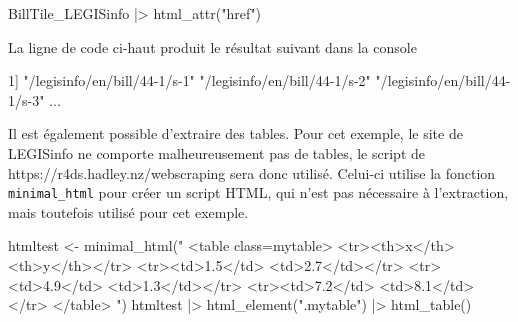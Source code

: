 \documentclass[
  letterpaper,
  DIV=11,
  numbers=noendperiod,
  oneside]{scrreprt}
\newenvironment{Shaded}{\begin{snugshade}}{\end{snugshade}}
\newcommand{\ErrorTok}[1]{\textcolor[rgb]{0.68,0.00,0.00}{#1}}
\newcommand{\ExtensionTok}[1]{\textcolor[rgb]{0.00,0.23,0.31}{#1}}
\newcommand{\KeywordTok}[1]{\textcolor[rgb]{0.00,0.23,0.31}{#1}}
\newcommand{\NormalTok}[1]{\textcolor[rgb]{0.00,0.23,0.31}{#1}}
\newcommand{\OperatorTok}[1]{\textcolor[rgb]{0.37,0.37,0.37}{#1}}
\newcommand{\StringTok}[1]{\textcolor[rgb]{0.13,0.47,0.30}{#1}}
\begin{document}
\begin{Shaded}
\begin{Highlighting}[]
\ExtensionTok{BillTile\_LEGISinfo} \KeywordTok{|}\OperatorTok{\textgreater{}}\NormalTok{ html\_attr}\KeywordTok{(}\StringTok{"href"}\KeywordTok{)}
\end{Highlighting}
\end{Shaded}

La ligne de code ci-haut produit le résultat suivant dans la console

\begin{Shaded}
\begin{Highlighting}[]
\ExtensionTok{1]} \StringTok{"/legisinfo/en/bill/44{-}1/s{-}1"}  
\StringTok{"/legisinfo/en/bill/44{-}1/s{-}2"} 
\StringTok{"/legisinfo/en/bill/44{-}1/s{-}3"}  
\ExtensionTok{...}
\end{Highlighting}
\end{Shaded}

Il est également possible d'extraire des tables. Pour cet exemple, le
site de LEGISinfo ne comporte malheureusement pas de tables, le script
de https://r4ds.hadley.nz/webscraping sera donc utilisé. Celui-ci
utilise la fonction \texttt{minimal\_html} pour créer un script HTML,
qui n'est pas nécessaire à l'extraction, mais toutefois utilisé pour cet
exemple.

\begin{Shaded}
\begin{Highlighting}[]
\ExtensionTok{htmltest} \OperatorTok{\textless{}}\NormalTok{{-} minimal\_html}\ErrorTok{(}\StringTok{"}
\StringTok{  \textless{}table class=\textquotesingle{}mytable\textquotesingle{}\textgreater{}}
\StringTok{\textless{}tr\textgreater{}\textless{}th\textgreater{}x\textless{}/th\textgreater{}   \textless{}th\textgreater{}y\textless{}/th\textgreater{}\textless{}/tr\textgreater{}}
\StringTok{\textless{}tr\textgreater{}\textless{}td\textgreater{}1.5\textless{}/td\textgreater{} \textless{}td\textgreater{}2.7\textless{}/td\textgreater{}\textless{}/tr\textgreater{}}
\StringTok{\textless{}tr\textgreater{}\textless{}td\textgreater{}4.9\textless{}/td\textgreater{} \textless{}td\textgreater{}1.3\textless{}/td\textgreater{}\textless{}/tr\textgreater{}}
\StringTok{\textless{}tr\textgreater{}\textless{}td\textgreater{}7.2\textless{}/td\textgreater{} \textless{}td\textgreater{}8.1\textless{}/td\textgreater{}\textless{}/tr\textgreater{}}
\StringTok{\textless{}/table\textgreater{}}
\StringTok{  "}\KeywordTok{)}
  \ExtensionTok{htmltest} \KeywordTok{|}\OperatorTok{\textgreater{}}
  \ExtensionTok{html\_element}\ErrorTok{(}\StringTok{".mytable"}\KeywordTok{)} \KeywordTok{|}\OperatorTok{\textgreater{}}\NormalTok{ html\_table}\KeywordTok{()}
\end{Highlighting}
\end{Shaded}
\end{document}

